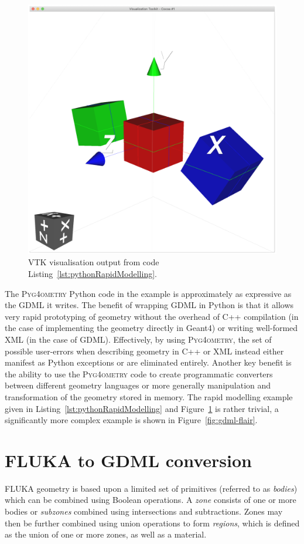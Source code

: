 \documentclass[final,5p,times,twocolumn]{elsarticle}
\newcommand{\PYGEOMETRY}{\textsc{Pyg4ometry}}
\begin{document}
\begin{figure}[htbp]
\begin{center}
\includegraphics[width=0.9\columnwidth]{./diagrams/rapidModelling.pdf}
\caption{VTK visualisation output from code Listing~\ref{lst:pythonRapidModelling}.}
\label{fig:rapidModellingExample}
\end{center}
\end{figure}

The \PYGEOMETRY{} Python code in the example is approximately as expressive
as the GDML it writes. The benefit of wrapping GDML in Python is that it allows
 very rapid prototyping of geometry without the overhead of C++ compilation  (in the
case of implementing the geometry directly in Geant4) or writing well-formed XML (in the case of GDML). Effectively,
by using \PYGEOMETRY{}, the set of possible user-errors when describing geometry in C++ or XML
instead either manifest as Python exceptions or are eliminated entirely.
Another key benefit is the ability to use the \PYGEOMETRY{} code to create
programmatic converters between different geometry languages or more generally
manipulation and transformation of the geometry stored in memory. The rapid modelling
example given in Listing~\ref{lst:pythonRapidModelling} and Figure~\ref{fig:rapidModellingExample}
is rather trivial, a significantly more complex example is shown in Figure~\ref{fig:gdml-flair}.

\section{FLUKA to GDML conversion}
FLUKA geometry is based upon a limited set of primitives (referred to as
\emph{bodies}) which can be combined using Boolean operations. A
\emph{zone} consists of one or more bodies or \emph{subzones} combined
using intersections and subtractions.  Zones may then be further combined
using union operations to form \emph{regions}, which is defined as the
union of one or more zones, as well as a material.
\end{document}

